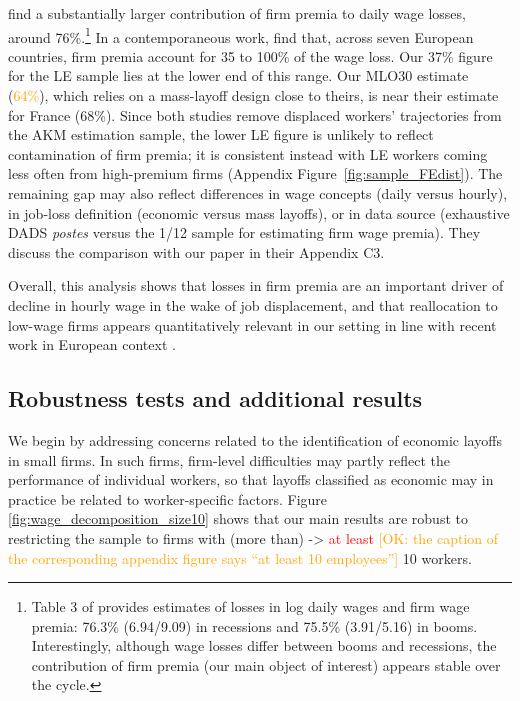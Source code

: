 \cite{Schmieder2020} find a substantially larger contribution of firm premia to daily wage losses, around 76\%.\footnote{Table 3 of \cite{Schmieder2020} provides estimates of losses in log daily wages and firm wage premia: 76.3\% (6.94/9.09) in recessions and 75.5\% (3.91/5.16) in booms. Interestingly, although wage losses differ between booms and recessions, the contribution of firm premia (our main object of interest) appears stable over the cycle.} In a contemporaneous work, \citet{bertheau_etal_2023} find that, across seven European countries, firm premia account for 35 to 100\% of the wage loss. Our 37\% figure for the LE sample lies at the lower end of this range. Our MLO30 estimate (\textcolor{orange}{64\%}), which relies on a mass-layoff design close to theirs, is near their estimate for France (68\%). Since both studies remove displaced workers' trajectories from the AKM estimation sample, the lower LE figure is unlikely to reflect contamination of firm premia; it is consistent instead with LE workers coming less often from high-premium firms (Appendix Figure~\ref{fig:sample_FEdist}). The remaining gap may also reflect differences in wage concepts (daily versus hourly), in job-loss definition (economic versus mass layoffs), or in data source (exhaustive DADS \textit{postes} versus the 1/12 sample for estimating firm wage premia). They discuss the comparison with our paper in their Appendix C3.

Overall, this analysis shows that losses in firm premia are an important driver of decline in hourly wage in the wake of job displacement, and that reallocation to low-wage firms appears quantitatively relevant in our setting in line with recent work in European context \citep[e.g.][]{Gulyas2019,Schmieder2020}.


\subsection{Robustness tests and additional results}
\label{sec:robustness}

We begin by addressing concerns related to the identification of economic layoffs in small firms. In such firms, firm-level difficulties may partly reflect the performance of individual workers, so that layoffs classified as economic may in practice be related to worker-specific factors. Figure \ref{fig:wage_decomposition_size10} shows that our main results are robust to restricting the sample to firms with (more than) -> \textcolor{red}{at least} \textcolor{orange}{[OK: the caption of the corresponding appendix figure says ``at least 10 employees'']} 10 workers.

